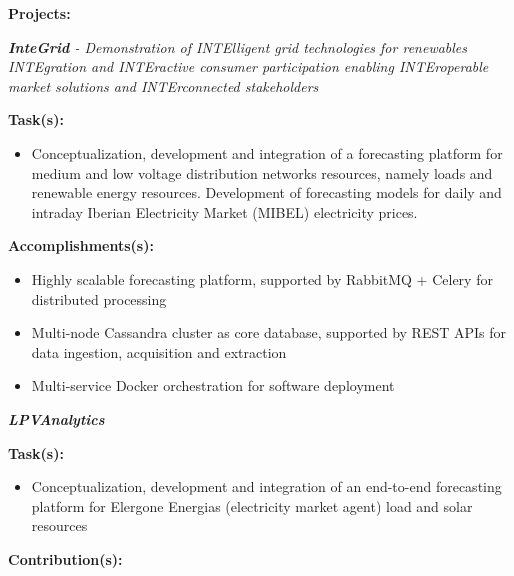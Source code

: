 \documentclass{mycv}
\begin{document}
\textbf{Projects:}
\vspace{0.1cm}

\begin{myitemize}	
	\item \textit{\textbf{InteGrid} - Demonstration of INTElligent grid technologies for renewables INTEgration and INTEractive consumer participation enabling INTEroperable market solutions and INTErconnected stakeholders}
	
		\vspace{0.4cm}
		\textbf{Task(s):}
		
		\begin{itemize}[itemsep=1px]
		\item Conceptualization, development and integration of a forecasting platform for medium and low voltage distribution networks resources, namely loads and renewable energy resources. Development of forecasting models for daily and intraday Iberian Electricity Market (MIBEL) electricity prices.
		\end{itemize}
		
		\textbf{Accomplishments(s):}
		\begin{itemize}[itemsep=1px]
			\item Highly scalable forecasting platform, supported by RabbitMQ + Celery for distributed processing
			\item Multi-node Cassandra cluster as core database, supported by REST APIs for data ingestion, acquisition and extraction
			\item Multi-service Docker orchestration for software deployment
		\end{itemize}
		\vspace{0.2cm}
		
	
	\vspace{0.6cm}	
	
	\item \textit{\textbf{LPVAnalytics}}
	
		\vspace{0.4cm}
		\textbf{Task(s):}
		
		\begin{itemize}[itemsep=1px]
			\item Conceptualization, development and integration of an end-to-end forecasting platform for Elergone Energias (electricity market agent) load and solar resources
		\end{itemize}
		
		\vspace{0.2cm}
		\textbf{Contribution(s):}
		

\end{myitemize}
\end{document}
